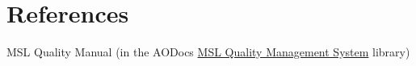 \section{References}

\begingroup
\renewcommand{\section}[2]{}%

\begin{thebibliography}{9}
 MSL Quality Manual (in the AODocs \href{https://aodocs.altirnao.com/?locale=en_NZ&aodocs-domain=callaghaninnovation.govt.nz#Menu_listDoc/LibraryId_SkJpYFA1uuD6N1jOV1/ViewId_SkJpcBbvZJa1IRko5Y/ViewParams_%257B%2522searchInSubFolders%2522:false,%2522searchInAttachments%2522:true,%2522userFilters%2522:%255B%257B%2522property%2522:%2522folder%2522,%2522operator%2522:%2522EQUAL%2522,%2522values%2522:%255B%25221r8UkK6gfEQ0VWsPOd9wLbWm0oamnYQok%2522%255D%257D%255D%257D}{MSL Quality Management System} library)
\end{thebibliography}

\endgroup